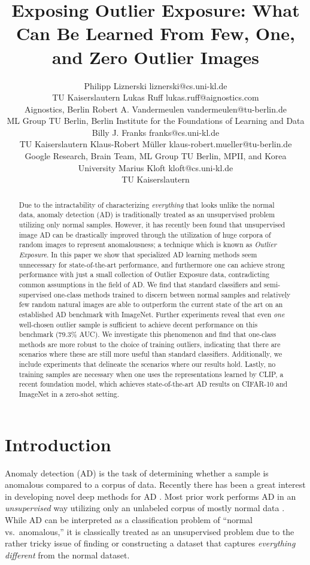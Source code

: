 \documentclass[10pt]{article} \usepackage[accepted]{stylefiles/tmlr}
\title{Exposing Outlier Exposure: What Can Be Learned From Few, One, and Zero Outlier Images}
\author{\name Philipp Liznerski \email liznerski@cs.uni-kl.de \\
      \addr TU Kaiserslautern
      \authorAND
      \name Lukas Ruff \email lukas.ruff@aignostics.com \\
      \addr Aignostics, Berlin
      \authorAND
      \name Robert A. Vandermeulen \email vandermeulen@tu-berlin.de \\
      \addr ML Group TU Berlin, Berlin Institute for the Foundations of Learning and Data
      \authorAND
      \name Billy J. Franks \email franks@cs.uni-kl.de \\
      \addr TU Kaiserslautern
      \authorAND
      \name Klaus-Robert M\"uller \email klaus-robert.mueller@tu-berlin.de  \\
      \addr Google Research, Brain Team, ML Group TU Berlin, MPII, and Korea University
      \authorAND
      \name Marius Kloft \email kloft@cs.uni-kl.de\\
      \addr TU Kaiserslautern}
\begin{document}
\maketitle

\begin{abstract} 
Due to the intractability of characterizing \emph{everything} that looks unlike the normal data, anomaly detection (AD) is traditionally treated as an unsupervised problem utilizing only normal samples.
However, it has recently been found that unsupervised image AD can be drastically improved through the utilization of huge corpora of random images to represent anomalousness; a technique which is known as \emph{Outlier Exposure}.
In this paper we show that specialized AD learning methods seem unnecessary for state-of-the-art performance, and furthermore one can achieve strong performance with just a small collection of Outlier Exposure data, contradicting common assumptions in the field of AD.
We find that standard classifiers and semi-supervised one-class methods trained to discern between normal samples and relatively few random natural images are able to outperform the current state of the art on an established AD benchmark with ImageNet.
Further experiments reveal that even \emph{one} well-chosen outlier sample is sufficient to achieve decent performance on this benchmark (79.3\% AUC).
We investigate this phenomenon and find that one-class methods are more robust to the choice of training outliers, indicating that there are scenarios where these are still more useful than standard classifiers.
Additionally, we include experiments that delineate the scenarios where our results hold.
Lastly, no training samples are necessary when one uses the representations learned by CLIP, a recent foundation model, which achieves state-of-the-art AD results on CIFAR-10 and ImageNet in a zero-shot setting.
\end{abstract}

\section{Introduction}
\label{sec:intro}

Anomaly detection (AD) \citep{chandola2009anomaly} is the task of determining whether a sample is anomalous compared to a corpus of data. 
Recently there has been a great interest in developing novel deep methods for AD \citep{ruff2021,pang2021}.
Most prior work performs AD in an \emph{unsupervised} way utilizing only an unlabeled corpus of mostly normal data \citep{golan2018deep, hendrycks2019using, bergman2020deep,tack2020}. 
While AD can be interpreted as a classification problem of ``normal vs.~anomalous,'' it is classically treated as an unsupervised problem due to the rather tricky issue of finding or constructing a dataset that captures \emph{everything different} from the normal dataset.
\end{document}
